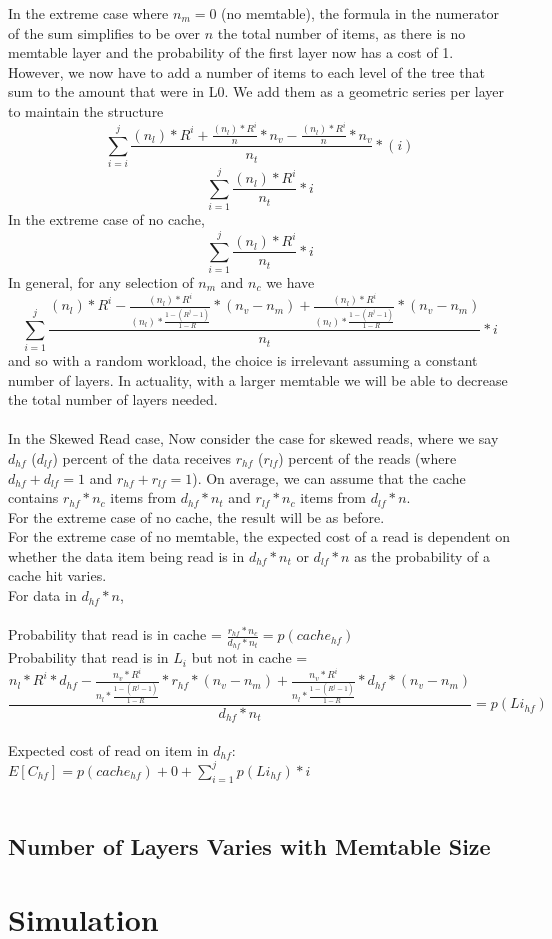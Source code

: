 \documentclass[11pt]{article}
\theoremstyle{plain}
\theoremstyle{definition}
\begin{document}
In the extreme case where $n_m=0$ (no memtable), the formula in the numerator of the sum simplifies to be over $n$ the total number of items, as there is no memtable layer and the probability of the first layer now has a cost of 1. However, we now have to add a number of items to each level of the tree that sum to the amount that were in L0. We add them as a geometric series per layer to maintain the structure
$$
\sum_{i=i}^{j} \frac{(n_l) * R^{i} + \frac{(n_l) * R^{i}}{n} * n_v - \frac{(n_l) * R^{i}}{n} * n_v}{n_t} * (i)
$$
$$
\sum_{i=1}^j \frac{(n_l) * R^i}{n_t} * i 
$$
In the extreme case of no cache, 
$$
\sum_{i=1}^j \frac{(n_l) * R^i}{n_t} * i 
$$
In general, for any selection of $n_m$ and $n_c$ we have
$$
\sum_{i=1}^j \frac{(n_l) * R^i - \frac{(n_l) * R^i}{(n_l) * \frac{1-(R^j-1)}{1-R}} * (n_v-n_m) + \frac{(n_l) * R^i}{(n_l) * \frac{1-(R^j-1)}{1-R}} * (n_v-n_m)}{n_t} * i 
$$
and so with a random workload, the choice is irrelevant assuming a constant number of layers. In actuality, with a larger memtable we will be able to decrease the total number of layers needed. \\
\\
In the Skewed Read case,
Now consider the case for skewed reads, where we say $d_{hf}$ ($d_{lf}$) percent of the data receives $r_{hf}$ ($r_{lf}$) percent of the reads (where $d_{hf} + d_{lf} = 1$ and $r_{hf} + r_{lf} = 1$). On average, we can assume that the cache contains $r_{hf} * n_c$ items from $d_{hf} * n_t$ and $r_{lf} * n_c$ items from $d_{lf} * n$. \\
For the extreme case of no cache, the result will be as before. \\
For the extreme case of no memtable, the expected cost of a read is dependent on whether the data item being read is in $d_{hf} * n_t$ or $d_{lf} * n$ as the probability of a cache hit varies.\\
For data in $d_{hf} * n$, \\ \\
Probability that read is in cache = $\frac{r_{hf} * n_c}{d_{hf} * n_t} = p(cache_{hf})$ \\
Probability that read is in $L_i$ but not in cache = 
$$ 
\frac{n_l * R^{i}*d_{hf} - \frac{n_v * R^{i}}{n_l * \frac{1-(R^j-1)}{1-R}} * r_{hf} * (n_v - n_m)+ \frac{n_v * R^{i}}{n_l * \frac{1-(R^j-1)}{1-R}} *d_{hf} *(n_v - n_m)}{d_{hf} * n_t}  = p(Li_{hf})
$$ \\
Expected cost of read on item in $d_{hf}$: $E[C_{hf}]= p(cache_{hf}) + 0 + \sum_{i=1}^j p(Li_{hf}) * i$\\ \\
\subsection{Number of Layers Varies with Memtable Size}

\section{Simulation}
\end{document}
